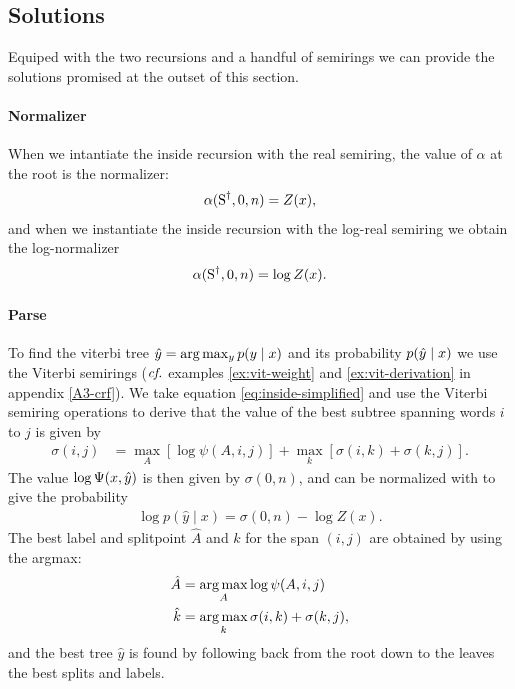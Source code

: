   \subsection{Solutions}
    Equiped with the two recursions and a handful of semirings we can provide the solutions promised at the outset of this section.

    \paragraph{Normalizer}
      When we intantiate the inside recursion with the real semiring, the value of $\alpha$ at the root is the normalizer:
      \begin{align*}
        \alpha(\text{S}^{\dagger}, 0, n) = Z(x),
      \end{align*}
      and when we instantiate the inside recursion with the log-real semiring we obtain the log-normalizer
      \begin{align*}
        \alpha(\text{S}^{\dagger}, 0, n) = \log Z(x).
      \end{align*}

    \paragraph{Parse}
      To find the viterbi tree $\hat{ y } = \arg \max_{ y } p(y  \mid x)$ and its probability $p(\hat{y} \mid x)$ we use the Viterbi semirings ($\emph{cf.}$ examples \ref{ex:vit-weight} and \ref{ex:vit-derivation} in appendix \ref{A3-crf}). We take equation \ref{eq:inside-simplified} and use the Viterbi semiring operations to derive that the value of the best subtree spanning words $i$ to $j$ is given by
      \begin{align}
        \label{eq:viterbi-score}
        \sigma(i,j)
          &= \max_{A} [ \log \psi(A, i, j) ] + \max_{k} [\sigma(i,k) + \sigma(k,j)].
      \end{align}
      The value $\log \Psi(x, \hat{y})$ is then given by $\sigma(0, n)$, and  can be normalized with to give the probability
      \begin{align}
        \log p(\hat{y} \mid x) = \sigma(0, n) - \log Z(x).
      \end{align}
      The best label and splitpoint $\hat{A}$ and $\hat{k}$ for the span $(i, j)$ are obtained by using the argmax:
      \begin{align}
        \label{eq:viterbi-tree}
        \hat{A} &= \operatorname*{arg\,max}_{ A  } \log \psi(A, i, j)  \\
        \hat{k} &= \operatorname*{arg\,max}_{ k } \sigma(i, k) + \sigma(k, j),
      \end{align}
      and the best tree $\hat{y}$ is found by following back from the root down to the leaves the best splits and labels.

